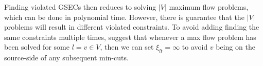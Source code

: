   Finding violated GSECs then reduces to solving $|V|$ maximum flow problems, which can be done in polynomial time. However, there is guarantee
  that the $|V|$ problems will result in different violated constraints.
  To avoid adding finding the same constraints multiple times, \citet{lucena2004strong} suggest that whenever a max flow problem has been
  solved for some $l = v \in V$, then we can set $\xi_{lt} = \infty$ to avoid $v$ being on the source-side of any subsequent min-cuts.



